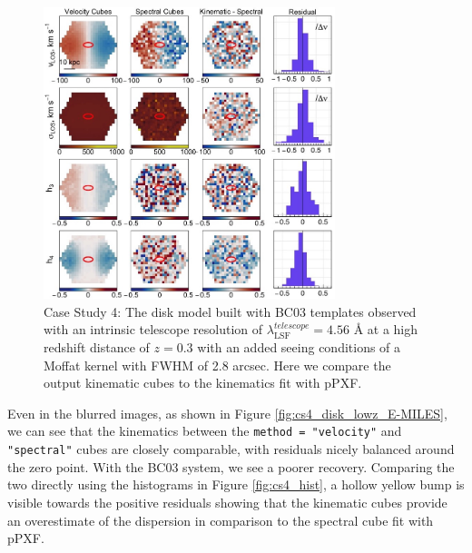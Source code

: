 \documentclass[
  journal=pasa,
  manuscript=research-paper, %
  year=2020,
  volume=37,
]{cup-journal}
\begin{document}
\begin{figure}
    \centering
    \includegraphics[keepaspectratio, width=8.5cm]{cs4_disk_velocities_highz_fwhm_blur_BC03.jpeg}
    \caption{Case Study 4: The disk model built with BC03 templates observed with an intrinsic telescope resolution of  $\lambda_{\text{LSF}}^{telescope} = 4.56$ \AA{} at a high redshift distance of $z = 0.3$ with an added seeing conditions of a Moffat kernel with FWHM of 2.8 arcsec. Here we compare the output kinematic cubes to the kinematics fit with pPXF.}
    \label{fig:cs4_disk_highz_BC03}
\end{figure}

Even in the blurred images, as shown in Figure \ref{fig:cs4_disk_lowz_E-MILES}, we can see that the kinematics between the \texttt{method = "velocity"} and \texttt{"spectral"} cubes are closely comparable, with residuals nicely balanced around the zero point.
With the BC03 system, we see a poorer recovery. 
Comparing the two directly using the histograms in Figure \ref{fig:cs4_hist}, a hollow yellow bump is visible towards the positive residuals showing that the kinematic cubes provide an overestimate of the dispersion in comparison to the spectral cube fit with pPXF. 
\end{document}

